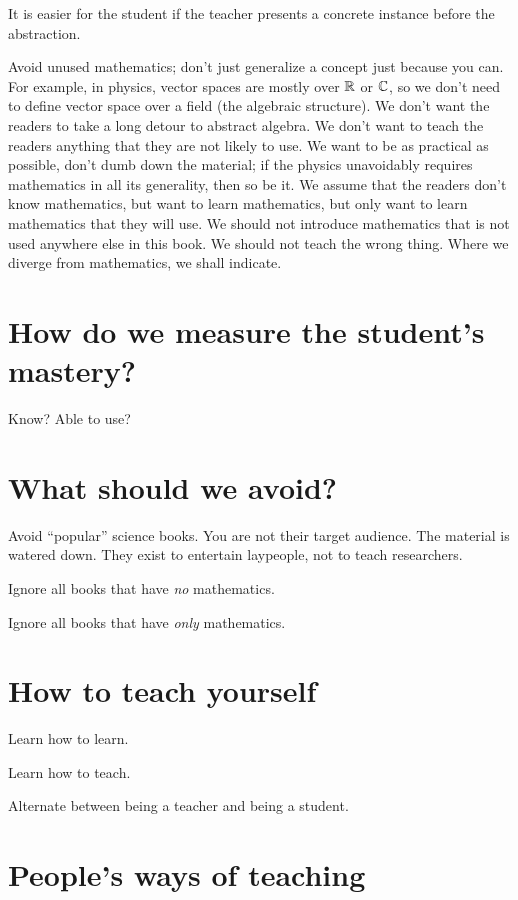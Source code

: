 It is easier for the student if the teacher
presents a concrete instance before the abstraction.

Avoid unused mathematics; don't just generalize a concept just because you can.
For example, in physics, vector spaces are mostly over \(\mathbb{R}\) or \(\mathbb{C}\),
so we don't need to define vector space over a field (the algebraic structure).
We don't want the readers to take a long detour to abstract algebra.
We don't want to teach the readers anything that they are not likely to use.
We want to be as practical as possible, don't dumb down the material;
if the physics unavoidably requires mathematics in all its generality, then so be it.
We assume that the readers don't know mathematics, but want to learn mathematics,
but only want to learn mathematics that they will use.
We should not introduce mathematics that is not used anywhere else in this book.
We should not teach the wrong thing.
Where we diverge from mathematics, we shall indicate.

\section{How do we measure the student's mastery?}

Know? Able to use?

\section{What should we avoid?}

Avoid \enquote{popular} science books.
You are not their target audience.
The material is watered down.
They exist to entertain laypeople, not to teach researchers.

Ignore all books that have \emph{no} mathematics.

Ignore all books that have \emph{only} mathematics.

\section{How to teach yourself}

Learn how to learn.

Learn how to teach.

Alternate between being a teacher and being a student.

\section{People's ways of teaching}

